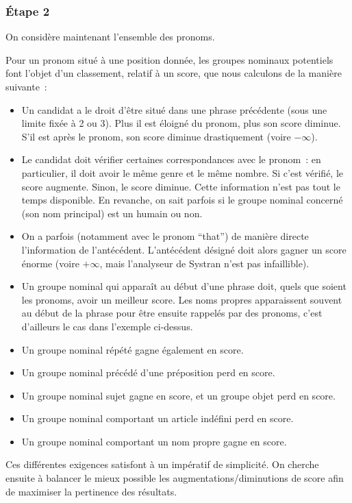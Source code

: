 \documentclass[a4paper, 12pt]{article}
\begin{document}
\subsubsection{Étape 2}
On considère maintenant l'ensemble des pronoms.

Pour un pronom situé à une position donnée, les groupes nominaux potentiels font l'objet d'un classement, relatif à un score, que nous calculons de la manière suivante~:

\begin{itemize}
 \item Un candidat a le droit d'être situé dans une phrase précédente (sous une limite fixée à 2 ou 3). Plus il est éloigné du pronom, plus son score diminue. S'il est après le pronom, son score diminue drastiquement (voire $-\infty$).
 \item Le candidat doit vérifier certaines correspondances avec le pronom~: en particulier, il doit avoir le même genre et le même nombre. Si c'est vérifié, le score augmente. Sinon, le score diminue. Cette information n'est pas tout le temps disponible. En revanche, on sait parfois si le groupe nominal concerné (son nom principal) est un humain ou non.
 \item On a parfois (notamment avec le pronom ``that'') de manière directe l'information de l'antécédent. L'antécédent désigné doit alors gagner un score énorme (voire $+\infty$, mais l'analyseur de Systran n'est pas infaillible).
 \item Un groupe nominal qui apparaît au début d'une phrase doit, quels que soient les pronoms, avoir un meilleur score. Les noms propres apparaissent souvent au début de la phrase pour être ensuite rappelés par des pronoms, c'est d'ailleurs le cas dans l'exemple ci-dessus.
 \item Un groupe nominal répété gagne également en score.
 \item Un groupe nominal précédé d'une préposition perd en score.
 \item Un groupe nominal sujet gagne en score, et un groupe objet perd en score. 
 \item Un groupe nominal comportant un article indéfini perd en score.
 \item Un groupe nominal comportant un nom propre gagne en score.
\end{itemize}

Ces différentes exigences satisfont à un impératif de simplicité. On cherche ensuite à balancer le mieux possible les augmentations/diminutions de score afin de maximiser la pertinence des résultats.
\end{document}
